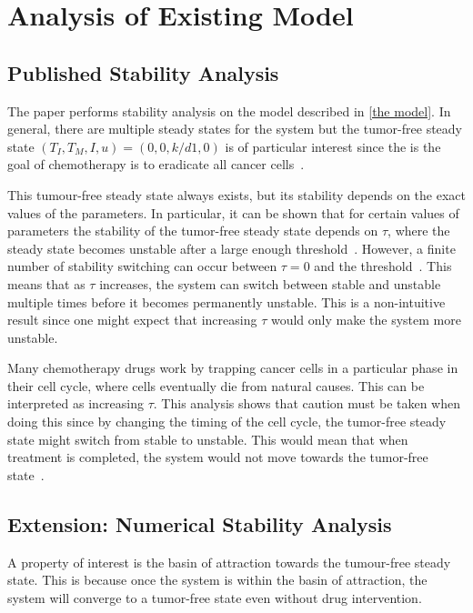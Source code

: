 \chapter{Analysis of Existing Model}

\section{Published Stability Analysis}

The paper performs stability analysis on the model described in \ref{the model}. In general, there are multiple steady states for the system but the tumor-free steady state $(T_I, T_M, I, u) = (0, 0, k/d1, 0)$ is of particular interest since the is the goal of chemotherapy is to eradicate all cancer cells~\cite{villasana_delay_2003}.

This tumour-free steady state always exists, but its stability depends on the exact values of the parameters. In particular, it can be shown that for certain values of parameters the stability of the tumor-free steady state depends on $\tau$, where the steady state becomes unstable after a large enough threshold~\cite{villasana_delay_2003}. However, a finite number of stability switching can occur between $\tau = 0$ and the threshold~\cite{cooke_zeroes_1986}. This means that as $\tau$ increases, the system can switch between stable and unstable multiple times before it becomes permanently unstable. This is a non-intuitive result since one might expect that increasing $\tau$ would only make the system more unstable.


Many chemotherapy drugs work by trapping cancer cells in a particular phase in their cell cycle, where cells eventually die from natural causes. This can be interpreted as increasing $\tau$. This analysis shows that caution must be taken when doing this since by changing the timing of the cell cycle, the tumor-free steady state might switch from stable to unstable. This would mean that when treatment is completed, the system would not move towards the tumor-free state~\cite{villasana_delay_2003}. 

\section{Extension: Numerical Stability Analysis}
\label{numerical stability analysis}

A property of interest is the basin of attraction towards the tumour-free steady state. This is because once the system is within the \gls{basin of attraction}, the system will converge to a tumor-free state even without drug intervention.


